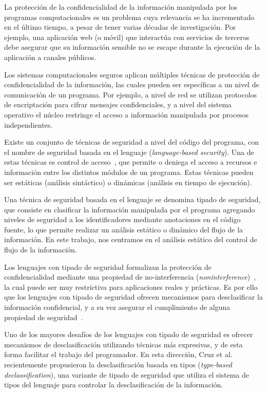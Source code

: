 \begin{intro}

	La protección de la confidencialidad de la información manipulada por los programas computacionales es un problema cuya relevancia se ha incrementado en el último tiempo, a pesar de tener varias décadas de investigación. Por ejemplo, una aplicación web (o móvil) que interactúa con servicios de terceros debe asegurar que su información sensible no se escape durante la ejecución de la aplicación a canales públicos.

	Los sistemas computacionales seguros aplican múltiples técnicas de protección de confidencialidad de la información, las cuales pueden ser específicas a un nivel de comunicación de un programa. Por ejemplo, a nivel de red se utilizan protocolos de encriptación para cifrar mensajes confidenciales, y a nivel del sistema operativo el núcleo restringe el acceso a información manipulada por procesos independientes.

	Existe un conjunto de técnicas de seguridad a nivel del código del programa, con el nombre de seguridad basada en el lenguaje (\emph{language-based security}). Una de estas técnicas es control de acceso~\cite{controlacceso}, que permite o deniega el acceso a recursos e información entre los distintos módulos de un programa. Estas técnicas pueden ser estáticas (análisis sintáctico) o dinámicas (análisis en tiempo de ejecución).

	Una técnica de seguridad basada en el lenguaje se denomina tipado de seguridad, que consiste en clasificar la información manipulada por el programa agregando niveles de seguridad a los identificadores mediante anotaciones en el código fuente, lo que permite realizar un análisis estático o dinámico del flujo de la información. En este trabajo, nos centramos en el análisis estático del control de flujo de la información.

	Los lenguajes con tipado de seguridad formalizan la protección de confidencialidad mediante una propiedad de no-interferencia (\emph{noninterference})~\cite{noninterference}, la cual puede ser muy restrictiva para aplicaciones reales y prácticas. Es por ello que los lenguajes con tipado de seguridad ofrecen mecanismos para desclasificar la información confidencial, y a su vez asegurar el cumplimiento de alguna propiedad de seguridad~\cite{sabelfeldSands:JCS09}.

	Uno de los mayores desafíos de los lenguajes con tipado de seguridad es ofrecer mecanismos de desclasificación utilizando técnicas más expresivas, y de esta forma facilitar el trabajo del programador. En esta dirección, Cruz et al.~\cite{cruzAl:ecoop2017} recientemente propusieron la desclasificación basada en tipos (\emph{type-based declassification}), una variante de tipado de seguridad que utiliza el sistema de tipos del lenguaje para controlar la desclasificación de la información.


\end{intro}
